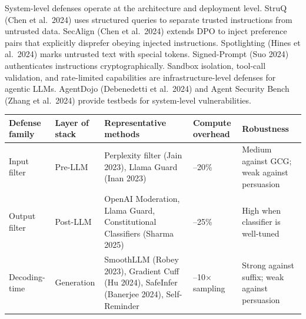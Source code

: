 System-level defenses operate at the architecture and deployment level. StruQ (Chen et al.~2024) uses structured queries to separate trusted instructions from untrusted data. SecAlign (Chen et al.~2024) extends DPO to inject preference pairs that explicitly disprefer obeying injected instructions. Spotlighting (Hines et al.~2024) marks untrusted text with special tokens. Signed-Prompt (Suo 2024) authenticates instructions cryptographically. Sandbox isolation, tool-call validation, and rate-limited capabilities are infrastructure-level defenses for agentic LLMs. AgentDojo (Debenedetti et al.~2024) and Agent Security Bench (Zhang et al.~2024) provide testbeds for system-level vulnerabilities.

{\def\LTcaptype{none} %
\begin{longtable}[]{@{}
  >{\raggedright\arraybackslash}p{}
  >{\raggedright\arraybackslash}p{}
  >{\raggedright\arraybackslash}p{}
  >{\raggedright\arraybackslash}p{}
  >{\raggedright\arraybackslash}p{}@{}}
\toprule\noalign{}
\begin{minipage}[b]{\linewidth}\raggedright
Defense family
\end{minipage} & \begin{minipage}[b]{\linewidth}\raggedright
Layer of stack
\end{minipage} & \begin{minipage}[b]{\linewidth}\raggedright
Representative methods
\end{minipage} & \begin{minipage}[b]{\linewidth}\raggedright
Compute overhead
\end{minipage} & \begin{minipage}[b]{\linewidth}\raggedright
Robustness
\end{minipage} \\
\midrule\noalign{}
\endhead
\bottomrule\noalign{}
\endlastfoot
Input filter & Pre-LLM & Perplexity filter (Jain 2023), Llama Guard (Inan 2023) & 5--20\% & Medium against GCG; weak against persuasion \\
Output filter & Post-LLM & OpenAI Moderation, Llama Guard, Constitutional Classifiers (Sharma 2025) & 10--25\% & High when classifier is well-tuned \\
Decoding-time & Generation & SmoothLLM (Robey 2023), Gradient Cuff (Hu 2024), SafeInfer (Banerjee 2024), Self-Reminder & 3--10× sampling & Strong against suffix; weak against persuasion \\

\end{longtable}}
